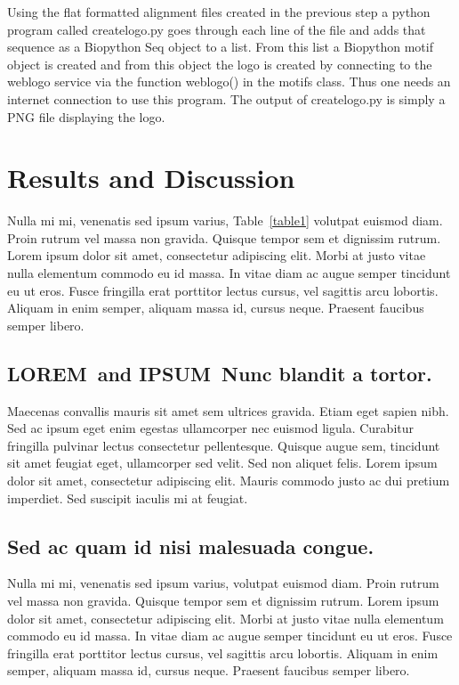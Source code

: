 \documentclass[10pt,letterpaper]{article}
\newcommand{\lorem}{{\bf LOREM}}
\newcommand{\ipsum}{{\bf IPSUM}}
\begin{document}
Using the flat formatted alignment files created in the previous step a python program called createlogo.py goes through each line of the file and adds that sequence as a Biopython Seq object to a list. From this list a Biopython motif object is created and from this object the logo is created by connecting to the weblogo service via the function weblogo() in the motifs class. Thus one needs an internet connection to use this program. The output of createlogo.py is simply a PNG file displaying the logo.

\section*{Results and Discussion}
Nulla mi mi, venenatis sed ipsum varius, Table~\ref{table1} volutpat euismod diam. Proin rutrum vel massa non gravida. Quisque tempor sem et dignissim rutrum. Lorem ipsum dolor sit amet, consectetur adipiscing elit. Morbi at justo vitae nulla elementum commodo eu id massa. In vitae diam ac augue semper tincidunt eu ut eros. Fusce fringilla erat porttitor lectus cursus, vel sagittis arcu lobortis. Aliquam in enim semper, aliquam massa id, cursus neque. Praesent faucibus semper libero.

\subsection*{\lorem\ and \ipsum\ Nunc blandit a tortor.}

Maecenas convallis mauris sit amet sem ultrices gravida. Etiam eget sapien nibh. Sed ac ipsum eget enim egestas ullamcorper nec euismod ligula. Curabitur fringilla pulvinar lectus consectetur pellentesque. Quisque augue sem, tincidunt sit amet feugiat eget, ullamcorper sed velit. Sed non aliquet felis. Lorem ipsum dolor sit amet, consectetur adipiscing elit. Mauris commodo justo ac dui pretium imperdiet. Sed suscipit iaculis mi at feugiat. 

\subsection*{Sed ac quam id nisi malesuada congue.}

Nulla mi mi, venenatis sed ipsum varius, volutpat euismod diam. Proin rutrum vel massa non gravida. Quisque tempor sem et dignissim rutrum. Lorem ipsum dolor sit amet, consectetur adipiscing elit. Morbi at justo vitae nulla elementum commodo eu id massa. In vitae diam ac augue semper tincidunt eu ut eros. Fusce fringilla erat porttitor lectus cursus, vel sagittis arcu lobortis. Aliquam in enim semper, aliquam massa id, cursus neque. Praesent faucibus semper libero.
\end{document}
